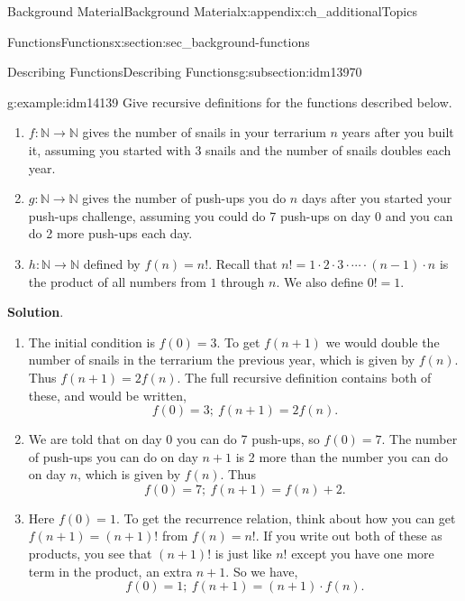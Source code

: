 \documentclass[oneside,10pt,]{book}
\numberwithin{equation}{chapter}
\def\N{\mathbb N}
\begin{document}
\begin{appendixptx}{Background Material}{}{Background Material}{}{}{x:appendix:ch_additionalTopics}
\begin{sectionptx}{Functions}{}{Functions}{}{}{x:section:sec_background-functions}
\begin{subsectionptx}{Describing Functions}{}{Describing Functions}{}{}{g:subsection:idm13970}
\begin{example}{}{g:example:idm14139}
Give recursive definitions for the functions described below.%
\begin{enumerate}
\item{}\(f:\N \to \N\) gives the number of snails in your terrarium \(n\) years after you built it, assuming you started with 3 snails and the number of snails doubles each year.%
\item{}\(g:\N \to \N\) gives the number of push-ups you do \(n\) days after you started your push-ups challenge, assuming you could do 7 push-ups on day 0 and you can do 2 more push-ups each day.%
\item{}\(h:\N \to \N\) defined by \(f(n) = n!\).  Recall that \(n! = 1 \cdot 2 \cdot 3 \cdot \cdots \cdot (n-1)\cdot n\) is the product of all numbers from \(1\) through \(n\).  We also define \(0! = 1\).%
\end{enumerate}
%
\par\smallskip%
\noindent\textbf{Solution}.\hypertarget{g:solution:idm14159}{}\quad{}%
\begin{enumerate}
\item{}The initial condition is \(f(0) = 3\).  To get \(f(n+1)\) we would double the number of snails in the terrarium the previous year, which is given by \(f(n)\).  Thus \(f(n+1) = 2f(n)\).  The full recursive definition contains both of these, and would be written,%
\begin{equation*}
f(0) = 3;~ f(n+1) = 2f(n).
\end{equation*}
%
\item{}We are told that on day 0 you can do 7 push-ups, so \(f(0) = 7\).  The number of push-ups you can do on day \(n+1\) is 2 more than the number you can do on day \(n\), which is given by \(f(n)\).  Thus%
\begin{equation*}
f(0) = 7;~ f(n+1) = f(n) + 2.
\end{equation*}
%
\item{}Here \(f(0) = 1\).  To get the recurrence relation, think about how you can get \(f(n+1) = (n+1)!\) from \(f(n) = n!\).  If you write out both of these as products, you see that \((n+1)!\) is just like \(n!\) except you have one more term in the product, an extra \(n+1\).  So we have,%
\begin{equation*}
f(0) = 1;~ f(n+1) = (n+1)\cdot f(n).
\end{equation*}
%
\end{enumerate}
%
\end{example}
\end{subsectionptx}
%
%
\typeout{************************************************}

\end{sectionptx}
\end{appendixptx}
\end{document}
